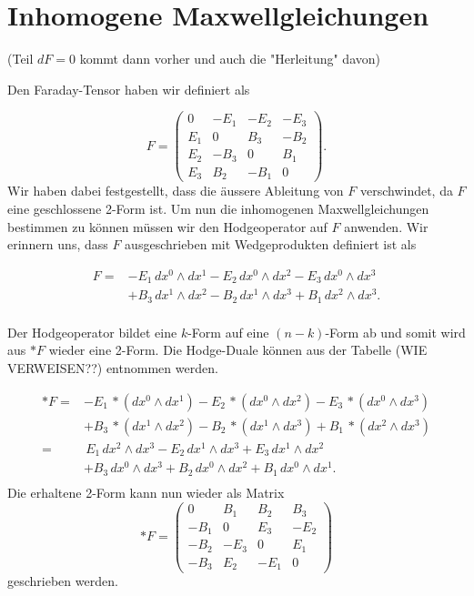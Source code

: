 %
%
%
%
\section{Inhomogene Maxwellgleichungen
	\label{maxwell:section:InhomogeneMaxwellgleichungen}}
(Teil $dF = 0$ kommt dann vorher und auch die "Herleitung" davon)

Den Faraday-Tensor haben wir definiert als

\begin{equation}
	F = \begin{pmatrix}
		0 & -E_1 & -E_2 & -E_3 \\ E_1 & 0 & B_3 & -B_2 \\ E_2 & -B_3 & 0 & B_1 \\ E_3 & B_2 & -B_1 & 0 
	\end{pmatrix}.
\end{equation}
Wir haben dabei festgestellt, dass die äussere Ableitung von $F$ verschwindet, da $F$ eine geschlossene 2-Form ist.
Um nun die inhomogenen Maxwellgleichungen bestimmen zu können müssen wir den Hodgeoperator auf $F$ anwenden.
Wir erinnern uns, dass $F$ ausgeschrieben mit Wedgeprodukten definiert ist als

\begin{align*}
	F = 
	&- E_1 \, dx^0 \wedge dx^1 - E_2 \, dx^0 \wedge dx^2 - E_3 \, dx^0 \wedge dx^3 \\
	&+ B_3 \, dx^1 \wedge dx^2 - B_2 \, dx^1 \wedge dx^3 + B_1 \, dx^2 \wedge dx^3.\\
\end{align*}

Der Hodgeoperator bildet eine $k$-Form auf eine $(n-k)$-Form ab und somit wird aus $\ast F$ wieder eine 2-Form.
Die Hodge-Duale können aus der Tabelle (WIE VERWEISEN??) entnommen werden.

\begin{align*}
	\ast F =
	& - E_{1} \, \ast(dx^0 \wedge dx^1) - E_{2} \, \ast(dx^0 \wedge dx^2) - E_{3} \, \ast(dx^0 \wedge dx^3) \\
	& + B_3 \, \ast(dx^1 \wedge dx^2) - B_2 \, \ast(dx^1 \wedge dx^3) + B_1 \, \ast(dx^2 \wedge dx^3)\\
	= 
	& \, E_{1} \, dx^2 \wedge dx^3 - E_{2} \, dx^1 \wedge dx^3 + E_{3} \, dx^1 \wedge dx^2 \\
	& + B_3 \, dx^0 \wedge dx^3 + B_2 \, dx^0 \wedge dx^2 + B_1 \, dx^0 \wedge dx^1.\\
\end{align*}
Die erhaltene 2-Form kann nun wieder als Matrix
\begin{equation}
	\ast F = \begin{pmatrix}
		0 & B_1 & B_2 & B_3 \\ -B_1 & 0 & E_3 & -E_2 \\ -B_2 & -E_3 & 0 & E_1 \\ -B_3 & E_2 & -E_1 & 0 
	\end{pmatrix}
\end{equation}
geschrieben werden.

